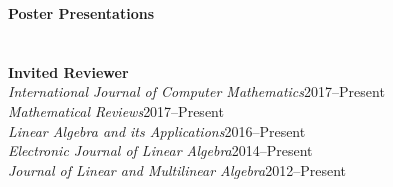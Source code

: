 \documentclass[margin,line,pifont,palatino,courier]{res}
\begin{document}
\begin{resume}
\begin{description}
\Fields{\Title\Date\Where\Address\Abslink\Conflink}


\vspace{10pt}
\item \textbf{Poster Presentations}

\Fields{\Title\Date\Where\Address\Abslink\Conflink}

 
\end{description}
 
 
 
 
 
 
 
\section{} 

\Fields{\Where\Short\From\To}

 
 
 
\section{} 
\begin{description}
\item \textbf{Invited Reviewer} \\
	{\sl International Journal of Computer Mathematics}\hfill  2017--Present\\
	{\sl Mathematical Reviews}\hfill  2017--Present\\
	{\sl Linear Algebra and its Applications}\hfill  2016--Present\\
	{\sl Electronic Journal of Linear Algebra}\hfill  2014--Present\\
	{\sl Journal of Linear and Multilinear Algebra}\hfill  2012--Present


\end{description}
\end{resume}
\end{document}
